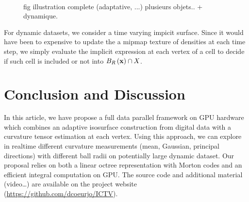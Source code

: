 \documentclass{llncs}
\begin{document}
\begin{figure}
  \begin{center}
   \\

  \end{center}
  \caption{fig illustration complete (adaptative, ...) plusieurs
    objets.. + dynamique.}
  \label{fig:full}
\end{figure}


For dynamic datasets, we consider a time varying impicit
surface. Since it would have been to expensive to update the a mipmap texture
of densities at each time step, we simply evaluate the implicit
expression at each vertex of a cell to decide if such cell is included
or not into $B_{R}\left(\mathbf{x}\right)\cap X$.



\section{Conclusion and Discussion}
\label{sec:discussion}

In this article, we have propose a full data parallel framework on GPU
hardware which combines an adaptive isosurface construction from
digital data with a curvature tensor estimation at each vertex. Using
this approach, we can explore in realtime different curvature
measurements (mean, Gaussian, principal directions) with different
ball radii on potentially large dynamic dataset. Our proposal relies
on both a linear octree representation with Morton codes and an
efficient integral computation on GPU.  The source code and additional
material (video\ldots) are available on the project website
(\url{https://github.com/dcoeurjo/ICTV}).




\end{document}
